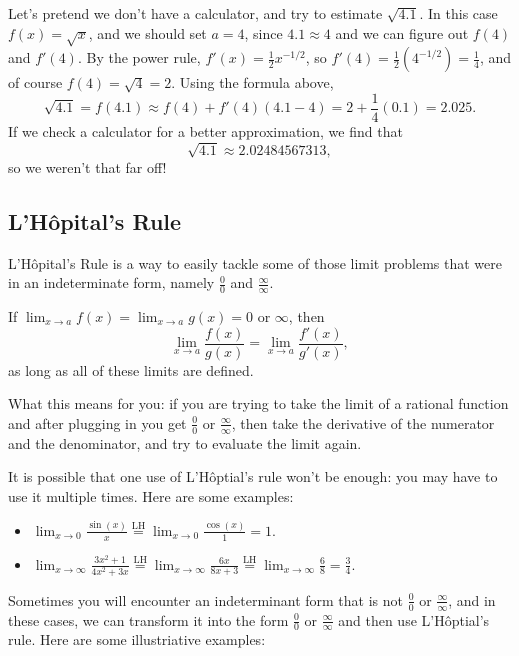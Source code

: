 Let's pretend we don't have a calculator, and try to estimate $\sqrt{4.1}$. In this case $f(x)=\sqrt{x}$, and we should set $a=4$, since $4.1\approx 4$ and we can figure out $f(4)$ and $f'(4)$. By the power rule, $f'(x)=\frac{1}{2}x^{-1/2}$, so $f'(4)=\frac12(4^{-1/2})=\frac14$, and of course $f(4)=\sqrt{4}=2$. Using the formula above,
$$\sqrt{4.1}=f(4.1)\approx f(4)+f'(4)(4.1-4)=2+\frac14(0.1)=2.025.$$
If we check a calculator for a better approximation, we find that
$$\sqrt{4.1}\approx 2.02484567313,$$
so we weren't that far off! 

\subsection{L'H\^opital's Rule}

L'H\^opital's Rule is a way to easily tackle some of those limit problems that were in an indeterminate form, namely $\frac{0}{0}$ and $\frac{\infty}{\infty}$.

\begin{thm}
If $\displaystyle \lim_{x\to a} f(x)= \lim_{x\to a} g(x)= 0$ or $\infty$, then
$$\lim_{x\to a}\frac{f(x)}{g(x)}=\lim_{x\to a}\frac{f'(x)}{g'(x)},$$
as long as all of these limits are defined.
\end{thm}

What this means for you: if you are trying to take the limit of a rational function and after plugging in you get $\frac{0}{0}$ or $\frac{\infty}{\infty}$, then take the derivative of the numerator and the denominator, and try to evaluate the limit again.

It is possible that one use of L'H\^optial's rule won't be enough: you may have to use it multiple times. Here are some examples:
\begin{itemize}
\item $\displaystyle \lim_{x\to 0}\frac{\sin(x)}{x}\overset{\text{LH}}{=}\lim_{x\to 0}\frac{\cos(x)}{1}=1.$
\item $\displaystyle \lim_{x\to \infty}\frac{3x^2+1}{4x^2+3x}\overset{\text{LH}}{=}\lim_{x\to\infty}\frac{6x}{8x+3}\overset{\text{LH}}{=}\lim_{x\to\infty}\frac{6}{8}=\frac{3}{4}$.
\end{itemize}

Sometimes you will encounter an indeterminant form that is not $\frac00$ or $\frac\infty\infty$, and in these cases, we can transform it into the form $\frac00$ or $\frac\infty\infty$ and then use L'H\^optial's rule. Here are some illustriative examples:

